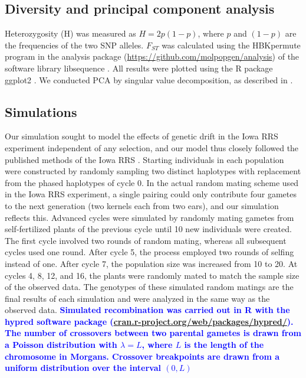 \documentclass[twocolumn,twoside,letterpaper]{article}
\newcommand{\rev}[1]{\textcolor{blue}{\bf #1}}
\begin{document}
\subsection*{Diversity and principal component analysis}
Heterozygosity (H) was measured as $H = 2p(1-p)$, where $p$ and $(1-p)$ are the frequencies of the two SNP alleles. 
$F_{ST}$ \citep{hudson1992statistical} was calculated using the HBKpermute program in the analysis package (\url{https://github.com/molpopgen/analysis}) of the software library libsequence \citep{thornton2003libsequence}. 
All results were plotted using the R package ggplot2 \citep{wickham2009ggplot2}. 
We conducted PCA by singular value decomposition, as described in \cite{mcvean2009genealogical}. 

\subsection*{Simulations}  
Our simulation sought to model the effects of genetic drift in the Iowa RRS experiment independent of any selection, and our model thus closely followed the published methods of the Iowa RRS \citep{penny1971twenty,  keeratinijakal1993responses}. 
Starting individuals in each population were constructed by randomly sampling two distinct haplotypes with replacement from the phased haplotypes of cycle 0. 
In the actual random mating scheme used in the Iowa RRS experiment, a single pairing could only contribute four gametes to the next generation (two kernels each from two ears), and our simulation reflects this. 
Advanced cycles were simulated by randomly mating gametes from self-fertilized plants of the previous cycle until 10 new individuals were created. 
The first cycle involved two rounds of random mating, whereas all subsequent cycles used one round. 
After cycle 5, the process employed two rounds of selfing instead of one. 
After cycle 7, the population size was increased from 10 to 20. 
At cycles 4, 8, 12, and 16, the plants were randomly mated to match the sample size of the observed data. 
The genotypes of these simulated random matings are the final results of each simulation and were analyzed in the same way as the observed data. 
\rev{Simulated recombination was carried out in R with the hypred software package (\url{cran.r-project.org/web/packages/hypred/}).
The number of crossovers between two parental gametes is drawn from a Poisson distribution with $\lambda = L$, where $L$ is the length of the chromosome in Morgans.
Crossover breakpoints are drawn from a uniform distribution over the interval $(0,L)$}
\end{document}
